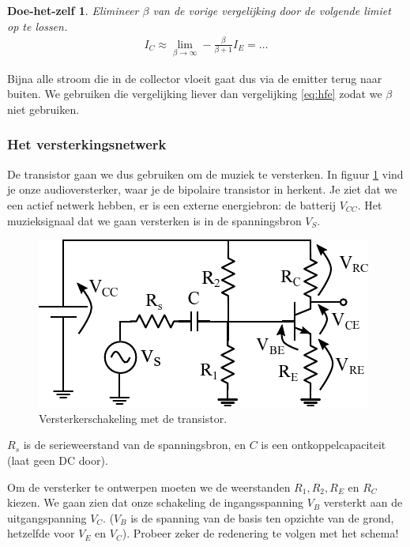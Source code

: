 \documentclass{article}
\newtheorem{DIY}{Doe-het-zelf}
\begin{document}
				\begin{DIY}
					Elimineer $\beta$ van de vorige vergelijking door de volgende limiet op te lossen.
					\begin{align*}
					     I_C \approx \lim_{\beta \rightarrow \infty} -\frac{\beta}{\beta+1}I_E = \ldots
					\end{align*}
				\end{DIY}

				Bijna alle stroom die in de collector vloeit gaat dus via de emitter terug naar buiten. We gebruiken die vergelijking liever dan vergelijking \ref{eq:hfe} zodat we $\beta$ niet gebruiken.

			\subsubsection{Het versterkingsnetwerk}
				De transistor gaan we dus gebruiken om de muziek te versterken. In figuur \ref{fig:ges} vind je onze audioversterker, waar je de bipolaire transistor in herkent. Je ziet dat we een actief netwerk hebben, er is een externe energiebron: de batterij $V_{CC}$. Het muzieksignaal dat we gaan versterken is in de spanningsbron $V_S$.

				\begin{figure}[htbp]
					\centering
					\includegraphics{ges}
					\caption{Versterkerschakeling met de transistor.}
					\label{fig:ges}
				\end{figure}

				$R_s$ is de serieweerstand van de spanningsbron, en $C$ is een ontkoppelcapaciteit (laat geen DC door).

				Om de versterker te ontwerpen moeten we de weerstanden $R_1,R_2,R_E$ en $R_C$ kiezen. We gaan zien dat onze schakeling de ingangsspanning $V_B$ versterkt aan de uitgangspanning $V_C$. ($V_B$ is de spanning van de basis ten opzichte van de grond, hetzelfde voor $V_E$ en $V_C$). Probeer zeker de redenering te volgen met het schema! 
\end{document}
